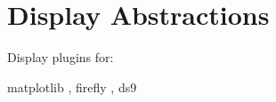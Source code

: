 \section{Display Abstractions}
\label{sec:display}

Display plugins for:

matplotlib \citep{2007CSE.....9...90H},
firefly \citep{2020ASPC..527..243R},
ds9 \citep{2003ASPC..295..489J}

